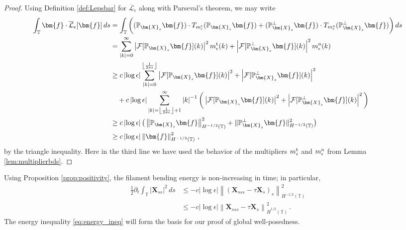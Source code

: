 \documentclass[11pt,reqno]{amsart}
\newcommand{\T}{\mathbb{T}}
\renewcommand{\P}{\mathbb{P}}
\newcommand{\X}{\bm{X}}
\newcommand{\p}{\partial}
\newcommand{\abs}[1]{\left\lvert #1 \right\rvert}
\newcommand{\norm}[1]{\left\lVert #1 \right\rVert}
\newcommand{\floor}[1]{\left\lfloor #1 \right\rfloor}
\newcommand{\mc}[1]{\mathcal{#1}}
\numberwithin{equation}{section}
\theoremstyle{definition}
\begin{document}
\begin{proof}
Using Definition \ref{def:Lepsbar} for $\overline{\mc{L}}_\epsilon$ along with Parseval's theorem, we may write 
\begin{equation}
\begin{aligned}
  \int_\T \bm{f}\cdot\overline{\mc{L}}_\epsilon[\bm{f}]\,ds &= \int_\T \bigg((\P_{\X_s}\bm{f})\cdot T_{m_\epsilon^{\rm t}}(\P_{\X_s}\bm{f}) + (\P_{\X_s}^\perp\bm{f})\cdot T_{m_\epsilon^{\rm n}}(\P_{\X_s}^\perp\bm{f}) \bigg)\, ds  \\
  &= \sum_{\abs{k}=0}^\infty \abs{\mc{F}[\P_{\X_s}\bm{f}](k)}^2m_\epsilon^{\rm t}(k) + \abs{\mc{F}[\P_{\X_s}^\perp\bm{f}](k)}^2m_\epsilon^{\rm n}(k) \\
  &\ge c\abs{\log\epsilon}\sum_{\abs{k}=0}^{\floor{\frac{1}{2\pi\epsilon}}} \abs{\mc{F}[\P_{\X_s}\bm{f}](k)}^2 + \abs{\mc{F}[\P_{\X_s}^\perp\bm{f}](k)}^2 \\
  &\quad + c\abs{\log\epsilon}\sum_{\abs{k}=\floor{\frac{1}{2\pi\epsilon}}+1}^{\infty} \abs{k}^{-1}\bigg(\abs{\mc{F}[\P_{\X_s}\bm{f}](k)}^2 + \abs{\mc{F}[\P_{\X_s}^\perp\bm{f}](k)}^2\bigg)\\
  &\ge c\abs{\log\epsilon}\big(\norm{\P_{\X_s}\bm{f}}_{H^{-1/2}(\T)}^2 + \|\P_{\X_s}^\perp\bm{f}\|_{H^{-1/2}(\T)}^2\big)\\
  &\ge c\abs{\log\epsilon}\norm{\bm{f}}_{H^{-1/2}(\T)}^2 \,,
\end{aligned}
\end{equation}
by the triangle inequality. Here in the third line we have used the behavior of the multipliers $m_\epsilon^{\rm t}$ and $m_\epsilon^{\rm n}$ from Lemma \ref{lem:multiplierbds}.
\end{proof}


Using Proposition \ref{prop:positivity}, the filament bending energy is non-increasing in time; in particular, 
\begin{equation}\label{eq:energy_ineq}
\begin{aligned}
\frac{1}{2}\p_t\int_\T \abs{\X_{ss}}^2\,ds &\le -c\abs{\log\epsilon}\norm{(\X_{sss}-\tau\X_s)_s}_{H^{-1/2}(\T)}^2 \\
&\le -c\abs{\log\epsilon}\norm{\X_{sss}-\tau\X_s}_{\dot H^{1/2}(\T)}^2\,.
\end{aligned}
\end{equation}
The energy inequality \eqref{eq:energy_ineq} will form the basis for our proof of global well-posedness.


\end{document}
